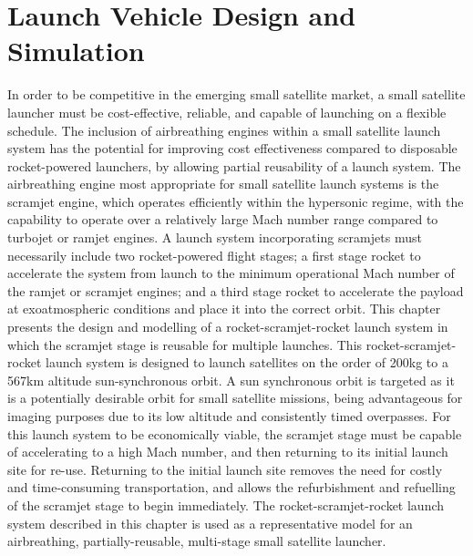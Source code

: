 
\cleardoublepage
\chapter{Launch Vehicle Design and Simulation}\label{chapter:Design}

In order to be competitive in the emerging small satellite market, a small satellite launcher must be cost-effective, reliable, and capable of launching on a flexible schedule. The inclusion of airbreathing engines within a small satellite launch system has the potential for improving cost effectiveness compared to disposable rocket-powered launchers, by allowing partial reusability of a launch system. The airbreathing engine most appropriate for small satellite launch systems is the scramjet engine, which operates efficiently within the hypersonic regime, with the capability to operate over a relatively large Mach number range compared to turbojet or ramjet engines. A launch system incorporating scramjets must necessarily include two rocket-powered flight stages; a first stage rocket to accelerate the system from launch to the minimum operational Mach number of the ramjet or scramjet engines; and a third stage rocket to accelerate the payload at exoatmospheric conditions and place it into the correct orbit. 
This chapter presents the design and modelling of a rocket-scramjet-rocket launch system in which the scramjet stage is reusable for multiple launches. 
This rocket-scramjet-rocket launch system is designed to launch satellites on the order of 200kg to a 567km altitude sun-synchronous orbit. A sun synchronous orbit is targeted as it is a potentially desirable orbit for small satellite missions, being advantageous for imaging purposes due to its low altitude and consistently timed overpasses.
For this launch system to be economically viable, the scramjet stage must be capable of accelerating to a high Mach number, and then returning to its initial launch site for re-use. Returning to the initial launch site removes the need for costly and time-consuming transportation, and allows the refurbishment and refuelling of the scramjet stage to begin immediately.
The rocket-scramjet-rocket launch system described in this chapter is used as a representative model for an airbreathing, partially-reusable, multi-stage small satellite launcher. 



